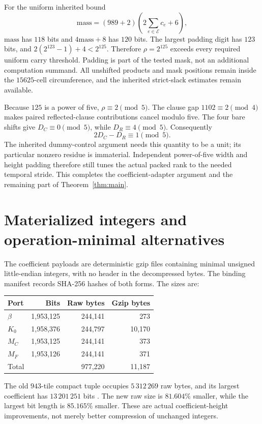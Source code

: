 \documentclass[11pt,a4paper]{article}
\theoremstyle{remark}\newtheorem{remark}[theorem]{Remark}
\begin{document}
For the uniform inherited bound
\[
 \mathrm{mass}=(989+2)\left(2\sum_{e\in\mathcal E}c_e+6\right),
\]
$\mathrm{mass}$ has $118$ bits and $4\mathrm{mass}+8$ has $120$ bits.
The largest padding digit has $123$ bits, and
$2(2^{123}-1)+4<2^{125}$. Therefore $\rho=2^{125}$ exceeds every
required uniform carry threshold. Padding is part of the tested mask,
not an additional computation summand. All unshifted products and mask
positions remain inside the $15625$-cell circumference, and the inherited
strict-slack estimates remain available.

Because $125$ is a power of five, $\rho\equiv2\pmod5$.
The clause gap $1102\equiv2\pmod4$ makes paired reflected-clause
contributions cancel modulo five. The four bare shifts give
$D_C\equiv0\pmod5$, while $D_R\equiv4\pmod5$. Consequently
\[
 \boxed{2D_C-D_R\equiv1\pmod5.}
\]
The inherited dummy-control argument needs this quantity to be a unit;
its particular nonzero residue is immaterial. Independent power-of-five
width and height padding therefore still tunes the actual packed rank
to the needed temporal stride. This completes the coefficient-adapter
argument and the remaining part of Theorem~\ref{thm:main}.

\section{Materialized integers and operation-minimal alternatives}

The coefficient payloads are deterministic gzip files containing minimal
unsigned little-endian integers, with no header in the decompressed bytes.
The binding manifest records SHA-256 hashes of both forms. The sizes are:
\begin{center}\small
\begin{tabular}{@{}lrrr@{}}
\toprule
Port & Bits & Raw bytes & Gzip bytes\\
\midrule
$\beta$ & 1,953,125 & 244,141 & 273\\
$K_0$ & 1,958,376 & 244,797 & 10,170\\
$M_C$ & 1,953,125 & 244,141 & 373\\
$M_F$ & 1,953,126 & 244,141 & 371\\
\midrule
Total & & 977,220 & 11,187\\
\bottomrule
\end{tabular}
\end{center}
The old $943$-tile compact tuple occupies $5\,312\,269$ raw bytes,
and its largest coefficient has $13\,201\,251$ bits \cite{compact943}.
The new raw size is $81.604\%$ smaller, while the largest bit length
is $85.165\%$ smaller. These are actual coefficient-height improvements,
not merely better compression of unchanged integers.
\end{document}

